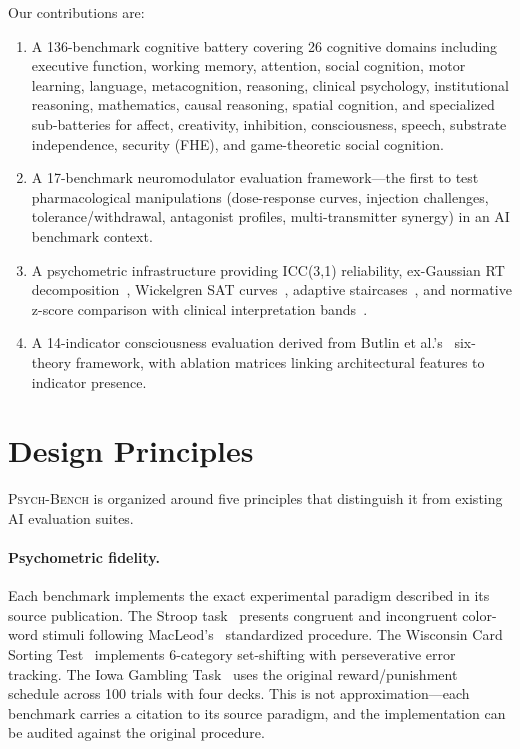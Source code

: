 \documentclass[11pt,letterpaper]{article}
\newcommand{\psychbench}{\textsc{Psych-Bench}}
\begin{document}
Our contributions are:
\begin{enumerate}[nosep]
    \item A 136-benchmark cognitive battery covering 26 cognitive domains including executive function, working memory, attention, social cognition, motor learning, language, metacognition, reasoning, clinical psychology, institutional reasoning, mathematics, causal reasoning, spatial cognition, and specialized sub-batteries for affect, creativity, inhibition, consciousness, speech, substrate independence, security (FHE), and game-theoretic social cognition.
    \item A 17-benchmark neuromodulator evaluation framework---the first to test pharmacological manipulations (dose-response curves, injection challenges, tolerance/withdrawal, antagonist profiles, multi-transmitter synergy) in an AI benchmark context.
    \item A psychometric infrastructure providing ICC(3,1) reliability, ex-Gaussian RT decomposition~\citep{heathcote1996fitting}, Wickelgren SAT curves~\citep{wickelgren1977speed}, adaptive staircases~\citep{levitt1971transformed}, and normative z-score comparison with clinical interpretation bands~\citep{cicchetti1994guidelines}.
    \item A 14-indicator consciousness evaluation derived from Butlin et al.'s~\citep{butlin2023consciousness} six-theory framework, with ablation matrices linking architectural features to indicator presence.
\end{enumerate}

\section{Design Principles}
\label{sec:principles}

\psychbench{} is organized around five principles that distinguish it from existing AI evaluation suites.

\paragraph{Psychometric fidelity.} Each benchmark implements the exact experimental paradigm described in its source publication. The Stroop task~\citep{stroop1935interference} presents congruent and incongruent color-word stimuli following MacLeod's~\citep{macleod1991half} standardized procedure. The Wisconsin Card Sorting Test~\citep{berg1948simple} implements 6-category set-shifting with perseverative error tracking. The Iowa Gambling Task~\citep{bechara1994insensitivity} uses the original reward/punishment schedule across 100 trials with four decks. This is not approximation---each benchmark carries a citation to its source paradigm, and the implementation can be audited against the original procedure.
\end{document}
